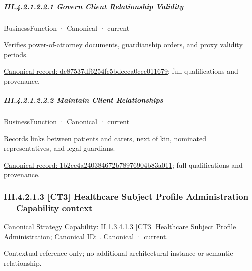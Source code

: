 \subparagraph*{III.4.2.1.2.2.1 Govern Client Relationship Validity}
\label{navigation:III.4.2.1.2.2.1}

\label{element:dc87537df6254fc5bdeeca0ccc011679}
{\small BusinessFunction · Canonical · current}\par

Verifies power-of-attorney documents, guardianship orders, and proxy validity periods.


{\footnotesize \href{../../../../../../../continuum/business/business-function/dc87537df6254fc5bdeeca0ccc011679.md}{Canonical record: dc87537df6254fc5bdeeca0ccc011679}; full qualifications and provenance.}\par
\subparagraph*{III.4.2.1.2.2.2 Maintain Client Relationships}
\label{navigation:III.4.2.1.2.2.2}

\label{element:1b2ce4a240384672b78976904b83a011}
{\small BusinessFunction · Canonical · current}\par

Records links between patients and carers, next of kin, nominated representatives, and legal guardians.


{\footnotesize \href{../../../../../../../continuum/business/business-function/1b2ce4a240384672b78976904b83a011.md}{Canonical record: 1b2ce4a240384672b78976904b83a011}; full qualifications and provenance.}\par
\subsubsection*{III.4.2.1.3 [CT3] Healthcare Subject Profile Administration — Capability context}
\label{navigation:III.4.2.1.3}

{\small Canonical Strategy Capability: II.1.3.4.1.3 \hyperref[element:df214b5499694b768eb4a7a175a9d471]{[CT3] Healthcare Subject Profile Administration}; Canonical ID: \texttt{}. Canonical · current.}\par
Contextual reference only; no additional architectural instance or semantic relationship.\par
